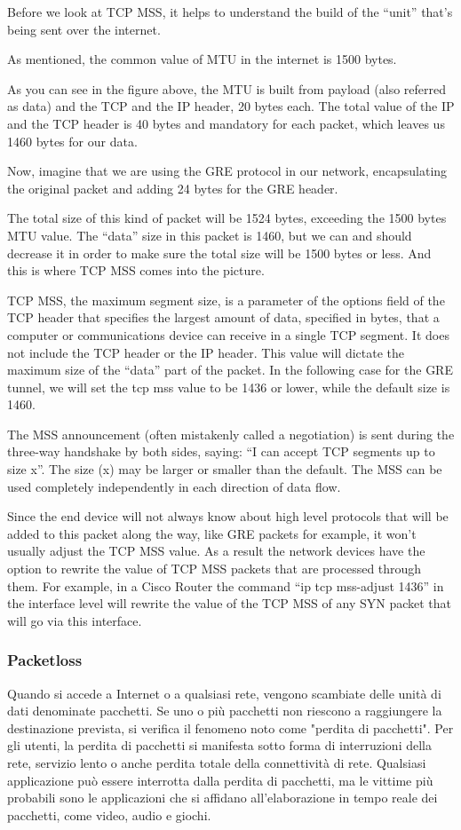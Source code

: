 Before we look at TCP MSS, it helps to understand the build of the  “unit” that’s being sent over the internet.


As mentioned, the common value of MTU in the internet is 1500 bytes.

As you can see in the figure above, the MTU is built from payload (also referred as data) and the TCP and the IP header, 20 bytes each. The total value of the IP and the TCP header is 40 bytes and mandatory for each packet, which leaves us 1460 bytes for our data.

Now, imagine that we are using the GRE protocol in our network, encapsulating the original packet and adding 24 bytes for the GRE header.

The total size of this kind of packet will be 1524 bytes, exceeding the 1500 bytes MTU value. The “data” size in this packet is 1460, but we can and should decrease it in order to make sure the total size will be 1500 bytes or less. And this is where TCP MSS comes into the picture.

TCP MSS, the maximum segment size, is a parameter of the options field of the TCP header that specifies the largest amount of data, specified in bytes, that a computer or communications device can receive in a single TCP segment. It does not include the TCP header or the IP header. This value will dictate the maximum size of the “data” part of the packet. In the following case for the GRE tunnel, we will set the tcp mss value to be 1436 or lower, while the default size is 1460.

The MSS announcement (often mistakenly called a negotiation) is sent during the three-way handshake by both sides, saying: “I can accept TCP segments up to size x”. The size (x) may be larger or smaller than the default. The MSS can be used completely independently in each direction of data flow.

Since the end device will not always know about high level protocols that will be added to this packet along the way, like GRE packets for example, it won’t usually adjust the TCP MSS value. As a result the network devices have the option to rewrite the value of TCP MSS packets that are processed through them. For example, in a Cisco Router the command “ip tcp mss-adjust 1436” in the interface level will rewrite the value of the TCP MSS of any SYN packet that will go via this interface.



\subsubsection{Packetloss}
Quando si accede a Internet o a qualsiasi rete, vengono scambiate delle unità di dati denominate pacchetti. Se uno o più pacchetti non riescono a raggiungere la destinazione prevista, si verifica il fenomeno noto come "perdita di pacchetti". Per gli utenti, la perdita di pacchetti si manifesta sotto forma di interruzioni della rete, servizio lento o anche perdita totale della connettività di rete. Qualsiasi applicazione può essere interrotta dalla perdita di pacchetti, ma le vittime più probabili sono le applicazioni che si affidano all’elaborazione in tempo reale dei pacchetti, come video, audio e giochi.

